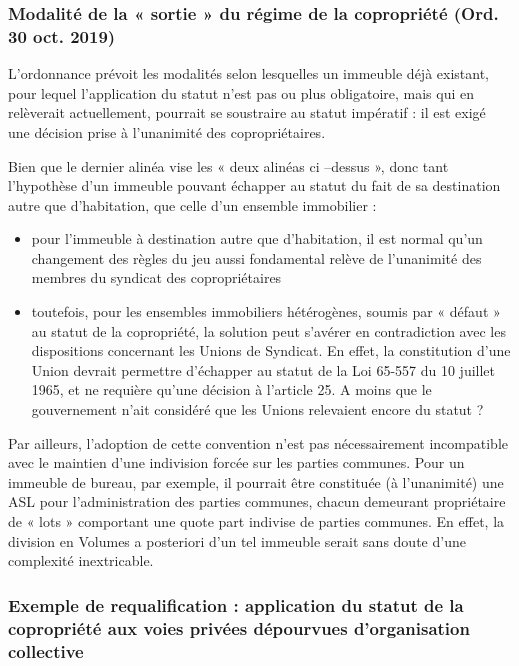 		\subsubsection{Modalité de la « sortie » du régime de la copropriété (Ord. 30 oct. 2019)}
		
			L’ordonnance prévoit les modalités selon lesquelles un immeuble déjà existant, pour lequel l’application
			du statut n’est pas ou plus obligatoire, mais qui en relèverait actuellement, pourrait se soustraire au statut
			impératif : il est exigé une décision prise à l’unanimité des copropriétaires.
		
			Bien que le dernier alinéa vise les « deux alinéas ci –dessus », donc tant l’hypothèse d’un immeuble
			pouvant échapper au statut du fait de sa destination autre que d’habitation, que celle d’un ensemble
			immobilier :
			\begin{itemize}
				\item  pour l’immeuble à destination autre que d’habitation, il est normal qu’un changement des
				règles du jeu aussi fondamental relève de l’unanimité des membres du syndicat des
				copropriétaires
				\item  toutefois, pour les ensembles immobiliers hétérogènes, soumis par « défaut » au statut de la
				copropriété, la solution peut s’avérer en contradiction avec les dispositions concernant les
				Unions de Syndicat. En effet, la constitution d’une Union devrait permettre d’échapper au
				statut de la Loi 65-557 du 10 juillet 1965, et ne requière qu’une décision à l’article 25. A moins
				que le gouvernement n’ait considéré que les Unions relevaient encore du statut ?
			\end{itemize}
			
			Par ailleurs, l’adoption de cette convention n’est pas nécessairement incompatible avec le maintien d’une
			indivision forcée sur les parties communes. Pour un immeuble de bureau, par exemple, il pourrait être
			constituée (à l’unanimité) une ASL pour l’administration des parties communes, chacun demeurant
			propriétaire de « lots » comportant une quote part indivise de parties communes. En effet, la division en
			Volumes a posteriori d’un tel immeuble serait sans doute d’une complexité inextricable.
		
		\subsubsection{Exemple de requalification : application du statut de la copropriété aux voies privées dépourvues d’organisation collective}
			
